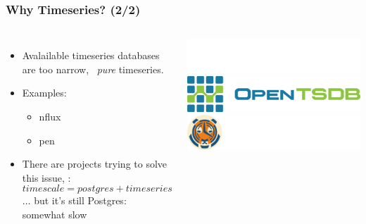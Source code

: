 \documentclass[mathserif,usenames,dvipsnames]{beamer}
\begin{document}
\begin{frame}
\frametitle{Why Timeseries? (2/2)}
\begin{columns}[T]
\begin{itemize}
\item Avalailable timeseries databases are too narrow, 
      \ie\ \emph{pure} timeseries.
\item Examples:
      \begin{itemize}
      \item {}nflux
      \item {}pen
      \end{itemize}
\item There are projects trying to solve this issue,
      \eg: \[
      timescale = postgres + timeseries\]
      $\dots$ but it's still Postgres: somewhat slow
\end{itemize}
\vskip1.0cm
\includegraphics[width=0.7\linewidth]{../img/influxlogo.png}\\[12pt]
\includegraphics[width=0.8\linewidth]{../img/tsdblogo.png}\\[12pt]
\vskip0.5cm
\includegraphics[width=0.8\linewidth]{../img/timescalelogo.png}
\end{columns}
\end{frame}
\end{document}

